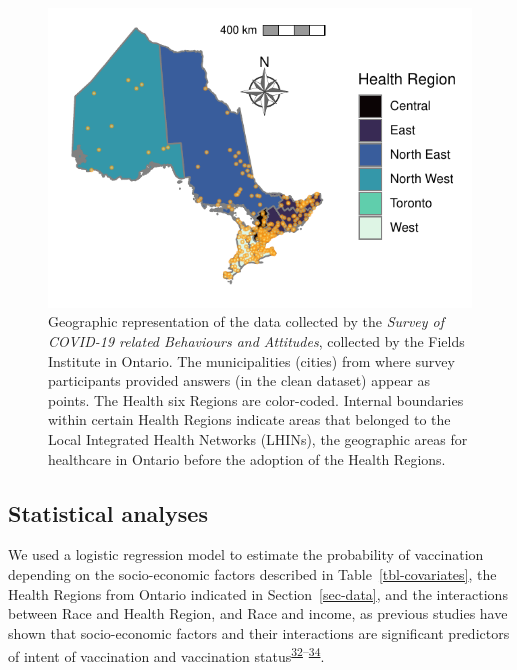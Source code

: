 \documentclass[
  letterpaper,
  DIV=11,
  numbers=noendperiod]{scrartcl}
\begin{document}
\begin{figure}

{\centering \includegraphics{../data/map_data/map.pdf}

}

\caption{\label{fig-map}Geographic representation of the data collected
by the \emph{Survey of COVID-19 related Behaviours and Attitudes},
collected by the Fields Institute in Ontario. The municipalities
(cities) from where survey participants provided answers (in the clean
dataset) appear as points. The Health six Regions are color-coded.
Internal boundaries within certain Health Regions indicate areas that
belonged to the Local Integrated Health Networks (LHINs), the geographic
areas for healthcare in Ontario before the adoption of the Health
Regions.}

\end{figure}

\hypertarget{statistical-analyses}{%
\subsection{Statistical analyses}\label{statistical-analyses}}

We used a logistic regression model to estimate the probability of
vaccination depending on the socio-economic factors described in
Table~\ref{tbl-covariates}, the Health Regions from Ontario indicated in
Section~\ref{sec-data}, and the interactions between Race and Health
Region, and Race and income, as previous studies have shown that
socio-economic factors and their interactions are significant predictors
of intent of vaccination and vaccination
status\textsuperscript{\protect\hyperlink{ref-nguyen2022}{32}--\protect\hyperlink{ref-cnat2022a}{34}}.
\end{document}
